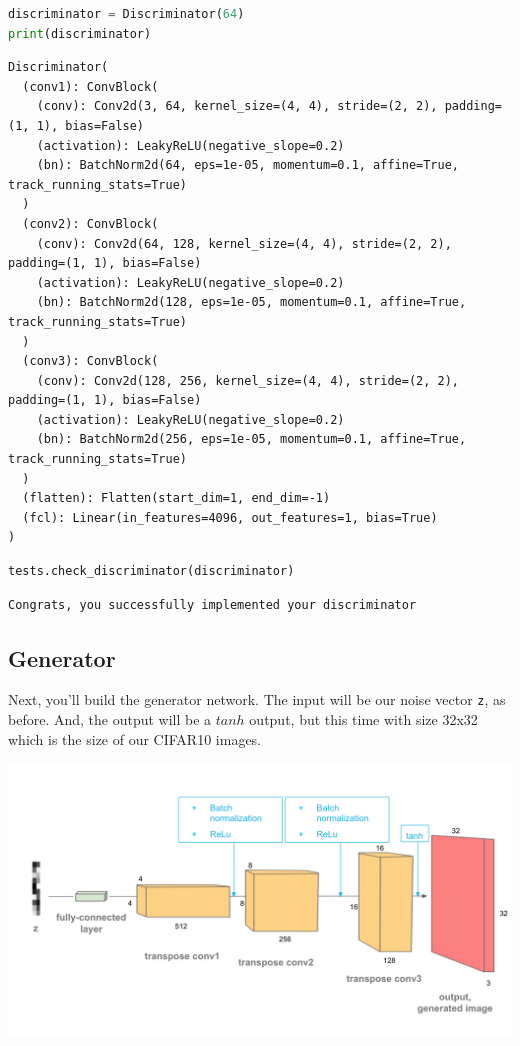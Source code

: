 \begin{lstlisting}[language=Python]
discriminator = Discriminator(64)
print(discriminator)
\end{lstlisting}

\begin{lstlisting}
Discriminator(
  (conv1): ConvBlock(
    (conv): Conv2d(3, 64, kernel_size=(4, 4), stride=(2, 2), padding=(1, 1), bias=False)
    (activation): LeakyReLU(negative_slope=0.2)
    (bn): BatchNorm2d(64, eps=1e-05, momentum=0.1, affine=True, track_running_stats=True)
  )
  (conv2): ConvBlock(
    (conv): Conv2d(64, 128, kernel_size=(4, 4), stride=(2, 2), padding=(1, 1), bias=False)
    (activation): LeakyReLU(negative_slope=0.2)
    (bn): BatchNorm2d(128, eps=1e-05, momentum=0.1, affine=True, track_running_stats=True)
  )
  (conv3): ConvBlock(
    (conv): Conv2d(128, 256, kernel_size=(4, 4), stride=(2, 2), padding=(1, 1), bias=False)
    (activation): LeakyReLU(negative_slope=0.2)
    (bn): BatchNorm2d(256, eps=1e-05, momentum=0.1, affine=True, track_running_stats=True)
  )
  (flatten): Flatten(start_dim=1, end_dim=-1)
  (fcl): Linear(in_features=4096, out_features=1, bias=True)
)
\end{lstlisting}

\begin{lstlisting}[language=Python]
tests.check_discriminator(discriminator)
\end{lstlisting}

\begin{lstlisting}
Congrats, you successfully implemented your discriminator
\end{lstlisting}

\subsection{Generator}

Next, you'll build the generator network. The input will be our noise
vector \lstinline{z}, as before. And, the output will be a
\(tanh\) output, but this time with size 32x32 which is the size of our
CIFAR10 images.

\includegraphics[width=1\linewidth]{img//genAdvNet//deepGAN/conv_generator.png}


